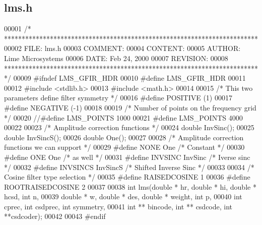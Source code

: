 \subsection{lms.\+h}
\label{lms_8h_source}

\begin{DoxyCode}
00001 \textcolor{comment}{/* ************************************************************************ }
00002 \textcolor{comment}{   FILE:    lms.h}
00003 \textcolor{comment}{   COMMENT: }
00004 \textcolor{comment}{   CONTENT:}
00005 \textcolor{comment}{   AUTHOR:  Lime Microsystems}
00006 \textcolor{comment}{   DATE:    Feb 24, 2000}
00007 \textcolor{comment}{   REVISION:}
00008 \textcolor{comment}{   ************************************************************************ */}
00009 \textcolor{preprocessor}{#ifndef LMS\_GFIR\_HDR}
00010 \textcolor{preprocessor}{#define LMS\_GFIR\_HDR}
00011 
00012 \textcolor{preprocessor}{#include <stdlib.h>}
00013 \textcolor{preprocessor}{#include <math.h>}
00014 
00015 \textcolor{comment}{/* This two parameters define filter symmetry */}
00016 \textcolor{preprocessor}{#define POSITIVE    (1)}
00017 \textcolor{preprocessor}{#define NEGATIVE    (-1)}
00018 
00019 \textcolor{comment}{/* Number of points on the frequency grid */}
00020 \textcolor{comment}{//#define LMS\_POINTS 1000}
00021 \textcolor{preprocessor}{#define LMS\_POINTS 4000}
00022 
00023 \textcolor{comment}{/* Amplitude correction functions */}
00024 \textcolor{keywordtype}{double} InvSinc();
00025 \textcolor{keywordtype}{double} InvSincS();
00026 \textcolor{keywordtype}{double} One();
00027 
00028 \textcolor{comment}{/* Amplitude correction functions we can support */}
00029 \textcolor{preprocessor}{#define NONE        One     }\textcolor{comment}{/* Constant */}\textcolor{preprocessor}{}
00030 \textcolor{preprocessor}{#define ONE     One     }\textcolor{comment}{/* as well */}\textcolor{preprocessor}{}
00031 \textcolor{preprocessor}{#define INVSINC     InvSinc     }\textcolor{comment}{/* Iverse sinc */}\textcolor{preprocessor}{}
00032 \textcolor{preprocessor}{#define INVSINCS    InvSincS    }\textcolor{comment}{/* Shifted Inverse Sinc */}\textcolor{preprocessor}{}
00033 
00034 \textcolor{comment}{/* Cosine filter type selection */}
00035 \textcolor{preprocessor}{#define RAISEDCOSINE        1}
00036 \textcolor{preprocessor}{#define ROOTRAISEDCOSINE    2}
00037 
00038 \textcolor{keywordtype}{int} lms(\textcolor{keywordtype}{double} * hr, \textcolor{keywordtype}{double} * hi, \textcolor{keywordtype}{double} * hcsd, \textcolor{keywordtype}{int} n, 
00039     \textcolor{keywordtype}{double} * w, \textcolor{keywordtype}{double} * des, \textcolor{keywordtype}{double} * weight, \textcolor{keywordtype}{int} p, 
00040     \textcolor{keywordtype}{int} cprec, \textcolor{keywordtype}{int} csdprec, \textcolor{keywordtype}{int} symmetry,
00041     \textcolor{keywordtype}{int} ** bincode, \textcolor{keywordtype}{int} ** csdcode, \textcolor{keywordtype}{int} **csdcoder); 
00042 
00043 \textcolor{preprocessor}{#endif}
\end{DoxyCode}
